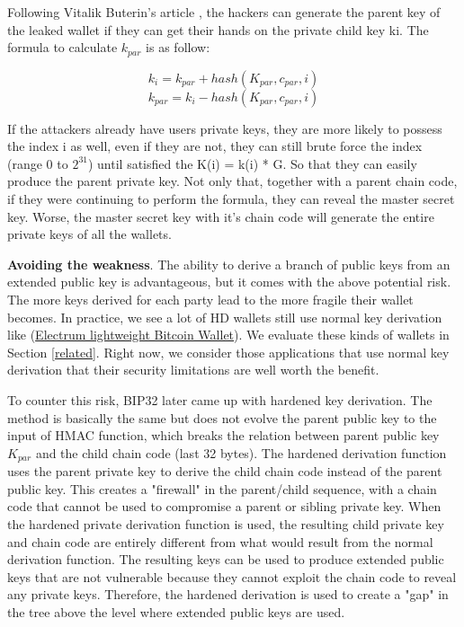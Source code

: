 \begin{adjustwidth}{1cm}{}
    Following Vitalik Buterin’s article \cite{Vitalik}, the hackers can generate the parent key of the leaked wallet if they can get their hands on the private child key ki. The formula to calculate $k_{par}$ is as follow:

    \begin{equation}
        k_i  = k_{par} + hash(K_{par}, c_{par}, i)
    \end{equation}
    \begin{equation}
        k_{par} = k_i - hash(K_{par}, c_{par}, i)
    \end{equation}

    \bigskip
    If the attackers already have users private keys, they are more likely to possess the index i as well, even if they are not, they can still brute force the index (range 0 to $2^{31}$) until satisfied the K(i) = k(i) * G. So that they can easily produce the parent private key. Not only that, together with a parent chain code, if they were continuing to perform the formula, they can reveal the master secret key. Worse, the master secret key with it’s chain code will generate the entire private keys of all the wallets.

    \bigskip
    {\textbf{Avoiding the weakness}}. The ability to derive a branch of public keys from an extended public key is advantageous, but it comes with the above potential risk. The more keys derived for each party lead to the more fragile their wallet becomes. In practice, we see a lot of HD wallets still use normal key derivation like (\href{https://electrum.org/#home}{Electrum lightweight Bitcoin Wallet}). We evaluate these kinds of wallets in Section \ref{related}. Right now, we consider those applications that use normal key derivation that their security limitations are well worth the benefit.

    To counter this risk, BIP32 later came up with hardened key derivation. The method is basically the same but does not evolve the parent public key to the input of HMAC function, which breaks the relation between parent public key $K_{par}$ and the child chain code (last 32 bytes). The hardened derivation function uses the parent private key to derive the child chain code instead of the parent public key. This creates a "firewall" in the parent/child sequence, with a chain code that cannot be used to compromise a parent or sibling private key. When the hardened private derivation function is used, the resulting child private key and chain code are entirely different from what would result from the normal derivation function. The resulting keys can be used to produce extended public keys that are not vulnerable because they cannot exploit the chain code to reveal any private keys. Therefore, the hardened derivation is used to create a "gap" in the tree above the level where extended public keys are used.


\end{adjustwidth}
